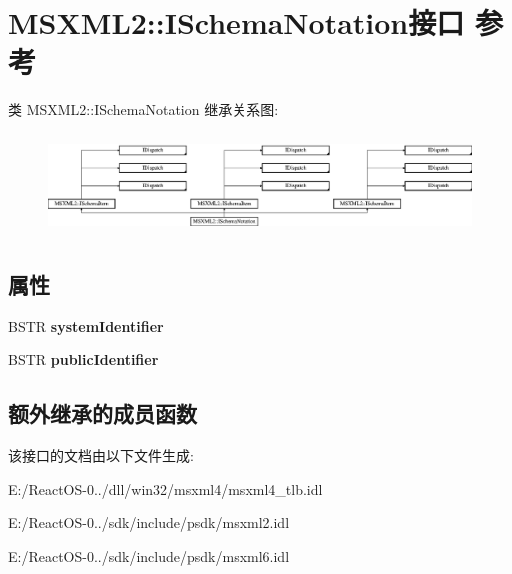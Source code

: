 \hypertarget{interface_m_s_x_m_l2_1_1_i_schema_notation}{}\section{M\+S\+X\+M\+L2\+:\+:I\+Schema\+Notation接口 参考}
\label{interface_m_s_x_m_l2_1_1_i_schema_notation}
类 M\+S\+X\+M\+L2\+:\+:I\+Schema\+Notation 继承关系图\+:\begin{figure}[H]
\begin{center}
\leavevmode
\includegraphics[height=2.697495cm]{interface_m_s_x_m_l2_1_1_i_schema_notation}
\end{center}
\end{figure}
\subsection*{属性}
\begin{DoxyCompactItemize}
\item 
\mbox{\label{interface_m_s_x_m_l2_1_1_i_schema_notation_a16bd8dbb016f77d2cc55ece5e3f3a549}} 
B\+S\+TR {\bfseries system\+Identifier}
\item 
\mbox{\label{interface_m_s_x_m_l2_1_1_i_schema_notation_ab2db4d4a4f5f0eee25c66ebb09824a9d}} 
B\+S\+TR {\bfseries public\+Identifier}
\end{DoxyCompactItemize}
\subsection*{额外继承的成员函数}


该接口的文档由以下文件生成\+:\begin{DoxyCompactItemize}
\item 
E\+:/\+React\+O\+S-\/0../dll/win32/msxml4/msxml4\+\_\+tlb.\+idl\item 
E\+:/\+React\+O\+S-\/0../sdk/include/psdk/msxml2.\+idl\item 
E\+:/\+React\+O\+S-\/0../sdk/include/psdk/msxml6.\+idl\end{DoxyCompactItemize}
